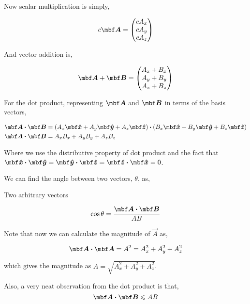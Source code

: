 Now scalar multiplication is simply, 

\[
    c\Aa = 
    \begin{pmatrix}
        cA_x \\
        cA_y \\
        cA_z
    \end{pmatrix}
\]

And vector addition is,

\[
    \Aa + \BB = 
    \begin{pmatrix}
        A_x + B_x\\
        A_y + B_y\\
        A_z + B_z 
    \end{pmatrix}
\]

For the dot product, representing \(\Aa\) and \(\BB\) in terms of the basis vectors,

\begin{align*}
    \Aa \dtp \BB &= (A_x \unitv{x} + A_y \unitv{y} + A_z \unitv{z}) \dtp (B_x \unitv{x} + B_y \unitv{y} + B_z \unitv{z}) \\
    \Aa \dtp \BB &= A_xB_x + A_yB_y + A_zB_z
\end{align*}

Where we use the distributive property of dot product and the fact 
that \(\unitv{x} \dtp \unitv{y} = \unitv{y} \dtp \unitv{z} = \unitv{z} \dtp \unitv{x} = 0\).

We can find the angle between two vectors, \(\theta\), as,

\begin{marginfigure}
    \centering
    \caption{Two arbitrary vectors}
\end{marginfigure}

\begin{equation*}
    \cos\theta = \frac{\vec{A} \dtp \vec{B}}{AB}
\end{equation*}

Note that now we can calculate the magnitude of \(\vec{A}\) as, 

\begin{equation*}
    \vec{A} \dtp \vec{A} = A^2 = A_x^2 + A_y^2 + A_z^2
\end{equation*}

which gives the magnitude as \(A = \sqrt{A_x^2 + A_y^2 + A_z^2}\).

Also, a very neat observation from the dot product is that,
\begin{equation*}
    \vec{A} \dtp \vec{B} \le AB
\end{equation*}

